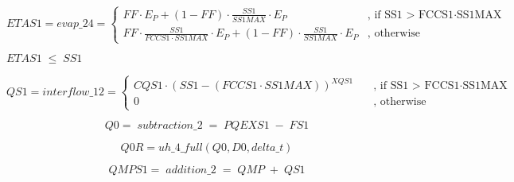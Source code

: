 \documentclass[11pt,color]{tudbook}
\begin{document}
\begin{onehalfspacing}
\begin{equation}
\label{eq:ETAS1}
 ETAS1 = evap\_24 = 
\begin{cases}
    FF \cdot E_P + (1-FF)\cdot \frac{SS1}{SS1MAX} \cdot E_P &\text{, if SS1 > FCCS1} \cdot \text{SS1MAX}  \\
    FF \cdot\frac{SS1}{FCCS1 \cdot SS1MAX} \cdot E_P + (1-FF) \cdot \frac{SS1}{SS1MAX} \cdot E_P &\text{, otherwise }
  \end{cases}
\end{equation}
\begin{center}
$ETAS1\;\leq\;SS1$
\end{center}

\begin{equation}
\label{eq:QS1}
 QS1 = interflow\_12 = 
\begin{cases}
    CQS1 \cdot (SS1 - (FCCS1 \cdot SS1MAX))^{XQS1} &\quad \text{, if SS1 > FCCS1} \cdot \text{SS1MAX}  \\
    0 & \quad \text{, otherwise} 
  \end{cases}
\end{equation}

\begin{equation}
\label{eq:Q0}
Q0 =\;subtraction\_2\;=\;PQEXS1\;-\;FS1
\end{equation}

\begin{equation}
\label{eq:Q0R}
Q0R = uh\_4\_full(Q0, D0, delta\_t)
\end{equation}


\begin{equation}
\label{eq:QMPS1}
QMPS1 =\;addition\_2\;= \;QMP\; +\; QS1
\end{equation}


\end{onehalfspacing}
\end{document}
